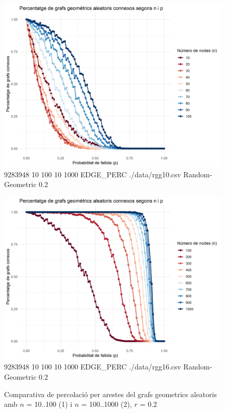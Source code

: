 \documentclass[a4paper]{article}
\begin{document}
	\begin{figure}[h]
		\centering
		\begin{minipage}{0.45\textwidth}
			\centering
			\includegraphics[width=\textwidth]{images/randomGeometric_10-100_0.2}
			\footnotesize{9283948 10 100 10 1000 EDGE\_PERC ./data/rgg10.csv Random-Geometric 0.2}
		\end{minipage}
		\hfill
		\begin{minipage}{0.45\textwidth}
			\centering
			\includegraphics[width=\textwidth]{images/randomGeometric_100-1000_0.2}
			\footnotesize{9283948 10 100 10 1000 EDGE\_PERC ./data/rgg16.csv Random-Geometric 0.2}
		\end{minipage}
		\caption{Comparativa de percolació per arestes del grafs geometrics aleatoris amb $n$ = 10..100 (1) i $n$ = 100..1000 (2), $r$ = 0.2}
		\label{fig:percolation_edges_rgg_0.8}
	\end{figure}
\end{document}
